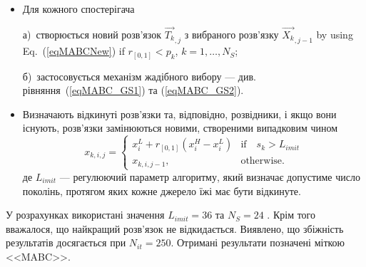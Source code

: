 \begin{itemize}[leftmargin=0cm,itemindent=1em]
 \item Для кожного спостерігача

 а)~створюється новий розв'язок $\overrightarrow{T_{k}}_{,j}$ з вибраного розв'язку
$\overrightarrow{X_{k}}_{,j-1}$ by using Eq.~(\ref{eqMABCNew}) if $r_{[0,1]}<p_k$, $k={1,\ldots,N_S}$;

 б)~застосовується механізм жадібного вибору --- див. рівняння~(\ref{eqMABC_GS1}) та (\ref{eqMABC_GS2}).

 \item
 Визначають відкинуті розв'язки та, відповідно, розвідники, і якщо вони існують, розв'язки замінюються новими, створеними випадковим чином
  \begin{equation}
 \label{eqMABCSC}
 x_{k,i,j}=\left\{
 \begin{array}{ll}
 x_i^L+r_{[0,1]}(x_i^H-x_i^L) & \text{if} \quad s_k>L_{imit}
 \\
 x_{k,i,j-1},& \text{otherwise}.
 \end{array}
 \right.
 \end{equation}
 де
 $L_{imit}$ --- регулюючий параметр алгоритму, який визначає допустиме число поколінь, протягом яких кожне джерело їжі має бути відкинуте.
\end{itemize}

У розрахунках використані значення $L_{imit}=36$ та $N_S=24$ \cite{MABC}.
Крім того вважалося, що найкращий розв'язок не відкидається.
Виявлено, що збіжність результатів досягається при $N_{it}=250$.
Отримані результати позначені міткою <<MABC>>.

